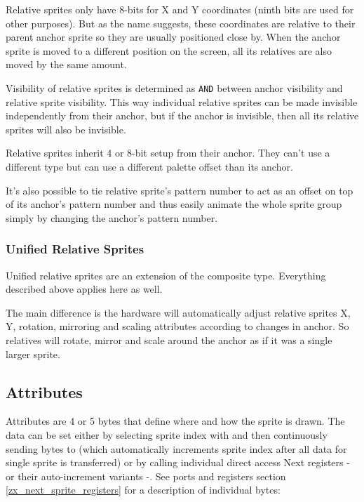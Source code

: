 Relative sprites only have 8-bits for X and Y coordinates (ninth bits are used for other purposes). But as the name suggests, these coordinates are relative to their parent anchor sprite so they are usually positioned close by. When the anchor sprite is moved to a different position on the screen, all its relatives are also moved by the same amount.

Visibility of relative sprites is determined as {\tt AND} between anchor visibility and relative sprite visibility. This way individual relative sprites can be made invisible independently from their anchor, but if the anchor is invisible, then all its relative sprites will also be invisible.

Relative sprites inherit 4 or 8-bit setup from their anchor. They can't use a different type but can use a different palette offset than its anchor.

It's also possible to tie relative sprite's pattern number to act as an offset on top of its anchor's pattern number and thus easily animate the whole sprite group simply by changing the anchor's pattern number.

\subsubsection{Unified Relative Sprites}

Unified relative sprites are an extension of the composite type. Everything described above applies here as well.

The main difference is the hardware will automatically adjust relative sprites X, Y, rotation, mirroring and scaling attributes according to changes in anchor. So relatives will rotate, mirror and scale around the anchor as if it was a single larger sprite.

\subsection{Attributes}

Attributes are 4 or 5 bytes that define where and how the sprite is drawn. The data can be set either by selecting sprite index with  and then continuously sending bytes to  (which automatically increments sprite index after all data for single sprite is transferred) or by calling individual direct access Next registers - or their auto-increment variants -. See ports and registers section \ref{zx_next_sprite_registers} for a description of individual bytes:

